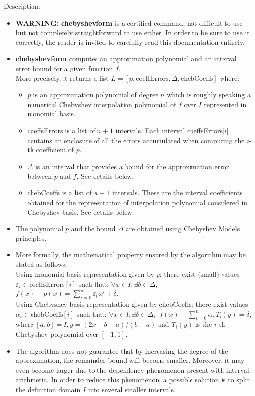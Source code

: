 \noindent Description: \begin{itemize}

\item \textbf{WARNING:} \textbf{chebyshevform} is a certified command, not difficult to use but not
   completely straightforward to use either. In order to be sure to use it
   correctly, the reader is invited to carefully read this documentation
   entirely.

\item \textbf{chebyshevform} computes an approximation polynomial and an interval error
   bound for a given function $f$.
   \\
   More precisely, it returns a list $L = \left[p, \textrm{coeffErrors},\Delta,\textrm{chebCoeffs} \right]$
   where:\begin{itemize}
   \item $p$ is an approximation polynomial of degree $n$ which is roughly speaking a
   numerical Chebyshev interpolation polynomial of $f$ over $I$ represented in
   monomial basis.
   \item coeffsErrors is a list of $n+1$ intervals. Each interval coeffsErrors[$i$]
   contains an enclosure of all the errors accumulated when computing the $i$-th
   coefficient of $p$.
   \item $\Delta$ is an interval that provides a bound for the approximation error
   between $p$ and $f$. See details below.
   \item $\textrm{chebCoeffs}$ is a list of $n+1$ intervals. These are the interval
   coefficients obtained for the representation of interpolation polynomial
   considered in Chebyshev basis. See details below.\end{itemize}

\item The polynomial $p$ and the bound $\Delta$ are obtained using Chebyshev Models
   principles.

\item More formally, the mathematical property ensured by the algorithm may be
   stated as follows:
   \\
   Using monomial basis representation given by $p$: there exist (small) values
   $\varepsilon_i \in \textrm{coeffsErrors}[i]$ such that:
   $\forall x \in I, \exists \delta \in \Delta,\,$
   $f(x)-p(x) = \sum\limits_{i=0}^{n} \varepsilon_i\, x^i + \delta$.
   \\
   Using Chebyshev basis representation given by $\textrm{chebCoeffs}$: there exist values
   $\alpha_i \in \textrm{chebCoeffs}[i]$ such that:
   $\forall x \in I, \exists \delta \in \Delta,\,$
   $f(x)-\sum\limits_{i=0}^{n} \alpha_i\, T_i(y)= \delta$,
   where $[a,b]=I, y=(2x-b-a)/(b-a)$ and $T_i(y)$ is the $i$-th Chebyshev polynomial
   over $[-1,1]$.

\item The algorithm does not guarantee that by increasing the degree of the
   approximation, the remainder bound will become smaller. Moreover, it may even
   become larger due to the dependency phenomenon present with interval
   arithmetic. In order to reduce this phenomenon, a possible solution is to
   split the definition domain $I$ into several smaller intervals.
\end{itemize}
